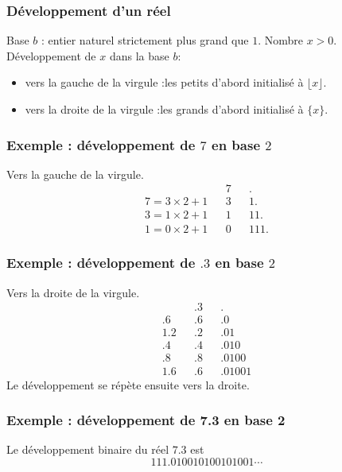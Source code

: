 \begin{frame}
  \frametitle{Développement d'un réel}
Base $b$ : entier naturel strictement plus grand que $1$.\newline
Nombre  $x>0$.\newline
Développement de $x$ dans la base $b$:
\begin{itemize}
  \item vers la gauche de la virgule :\newline \og les petits d'abord \fg initialisé à $\lfloor x \rfloor$.
  \item vers la droite de la virgule :\newline \og les grands d'abord \fg initialisé à  $\{ x \}$.
\end{itemize}
\end{frame}

\begin{frame}
  \frametitle{Exemple : développement de $7$ en base $2$}
Vers la gauche de la virgule.
\begin{align*}
  & & 7 & & . \\
7 = 3\times 2 + 1 & & 3 & & 1. \\
3 = 1\times 2 + 1 & & 1 & & 11. \\
1 = 0\times 2 + 1 & & 0 & & 111.
\end{align*}
\end{frame}

\begin{frame}
  \frametitle{Exemple : développement de $.3$ en base $2$}
Vers la droite de la virgule.
\begin{align*}
    & & .3 & & .   \\
.6  & & .6 & & .0  \\
1.2 & & .2 & & .01 \\
.4  & & .4 & & .010 \\
.8  & & .8 & & .0100 \\
1.6 & & .6 & & .01001
\end{align*}
Le développement se répète ensuite vers la droite.
\end{frame}

\begin{frame}
  \frametitle{Exemple : développement de 7.3 en base 2}
Le développement binaire du réel $7.3$ est
\begin{displaymath}
  111.01001 01001 01001 \cdots
\end{displaymath}  
\end{frame}


